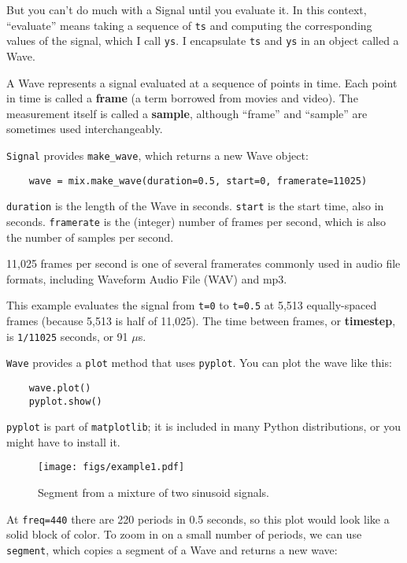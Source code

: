 \documentclass[12pt]{book}
\begin{document}
But you can't do much with a
Signal until you evaluate it.
In this context, ``evaluate'' means taking a sequence of {\tt ts}
and computing the corresponding values of the signal, which I
call {\tt ys}.  I encapsulate {\tt ts} and {\tt ys} in an
object called a Wave.

A Wave represents a signal evaluated at a sequence of points in
time.  Each point in time is called a {\bf frame} (a term borrowed
from movies and video).  The measurement itself is called a
{\bf sample}, although ``frame'' and ``sample'' are sometimes
used interchangeably.

{\tt Signal} provides \verb"make_wave", which returns a new
Wave object:

\begin{verbatim}
    wave = mix.make_wave(duration=0.5, start=0, framerate=11025)
\end{verbatim}

{\tt duration} is the length of the Wave in seconds.  {\tt start} is
the start time, also in seconds.  {\tt framerate} is the (integer)
number of frames per second, which is also the number of samples
per second.

11,025 frames per second is one of several framerates commonly used in
audio file formats, including Waveform Audio File (WAV) and mp3. 

This example evaluates the signal from {\tt t=0} to {\tt t=0.5} at
5,513 equally-spaced frames (because 5,513 is half of 11,025).
The time between frames, or {\bf timestep}, is {\tt 1/11025} seconds, or
91 $\mu$s.

{\tt Wave} provides a {\tt plot} method that uses {\tt pyplot}.
You can plot the wave like this:

\begin{verbatim}
    wave.plot()
    pyplot.show()
\end{verbatim}

{\tt pyplot} is part of {\tt matplotlib}; it is included in many
Python distributions, or you might have to install it.

\begin{figure}
\centerline{\texttt{[image: figs/example1.pdf]}}
\caption{Segment from a mixture of two sinusoid signals.}
\label{fig.example1}
\end{figure}

At {\tt freq=440} there are 220 periods in 0.5 seconds, so this plot
would look like a solid block of color.  To zoom in on a small number
of periods, we can use {\tt segment}, which copies a segment of a Wave
and returns a new wave:
\end{document}
